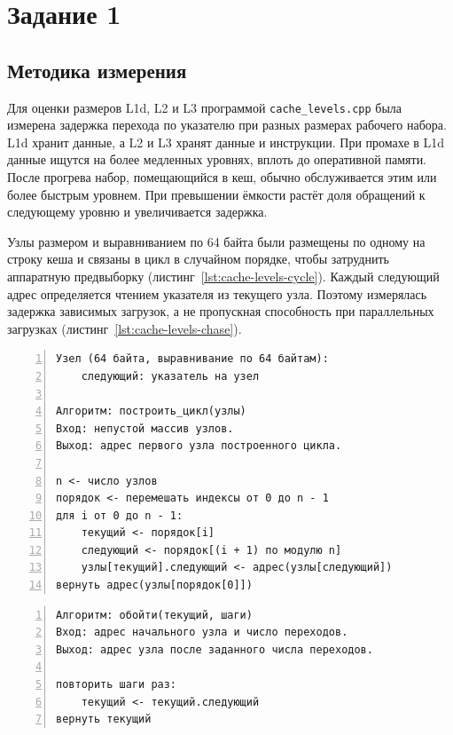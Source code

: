 \section{Задание 1}

\subsection{Методика измерения}

Для оценки размеров L1d, L2 и L3 программой \texttt{cache\_levels.cpp} была измерена задержка перехода по указателю при разных размерах рабочего набора. L1d хранит данные, а L2 и L3 хранят данные и инструкции. При промахе в L1d данные ищутся на более медленных уровнях, вплоть до оперативной памяти. После прогрева набор, помещающийся в кеш, обычно обслуживается этим или более быстрым уровнем. При превышении ёмкости растёт доля обращений к следующему уровню и увеличивается задержка.

Узлы размером и выравниванием по 64 байта были размещены по одному на строку кеша и связаны в цикл в случайном порядке, чтобы затруднить аппаратную предвыборку (листинг~\ref{lst:cache-levels-cycle}). Каждый следующий адрес определяется чтением указателя из текущего узла. Поэтому измерялась задержка зависимых загрузок, а не пропускная способность при параллельных загрузках (листинг~\ref{lst:cache-levels-chase}).

\begin{Verbatim}[frame=single,numbers=left,fontsize=\small,breaklines=true]
Узел (64 байта, выравнивание по 64 байтам):
    следующий: указатель на узел

Алгоритм: построить_цикл(узлы)
Вход: непустой массив узлов.
Выход: адрес первого узла построенного цикла.

n <- число узлов
порядок <- перемешать индексы от 0 до n - 1
для i от 0 до n - 1:
    текущий <- порядок[i]
    следующий <- порядок[(i + 1) по модулю n]
    узлы[текущий].следующий <- адрес(узлы[следующий])
вернуть адрес(узлы[порядок[0]])
\end{Verbatim}

\begin{Verbatim}[frame=single,numbers=left,fontsize=\small,breaklines=true]
Алгоритм: обойти(текущий, шаги)
Вход: адрес начального узла и число переходов.
Выход: адрес узла после заданного числа переходов.

повторить шаги раз:
    текущий <- текущий.следующий
вернуть текущий
\end{Verbatim}

